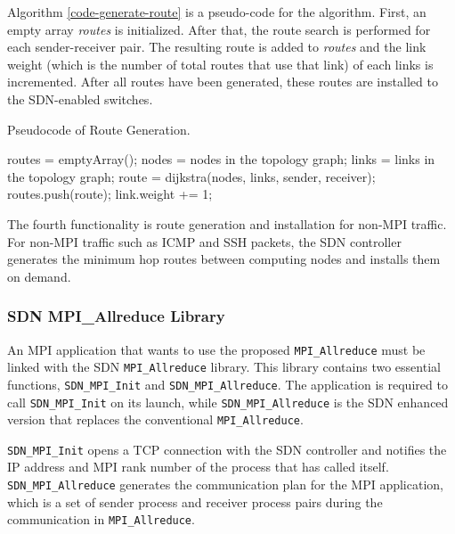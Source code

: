 Algorithm \ref{code-generate-route} is a pseudo-code for the algorithm.
First, an empty array \emph{routes} is initialized. After that, the
route search is performed for each sender-receiver pair. The resulting
route is added to \emph{routes} and the link weight (which is the number
of total routes that use that link) of each links is incremented. After
all routes have been generated, these routes are installed to the
SDN-enabled switches.

\begin{algorithm}
    \caption{Pseudocode of Route Generation.}
    \label{code-generate-route}
    \begin{algorithmic}
        \STATE routes = emptyArray();
        \STATE nodes = nodes in the topology graph;
        \STATE links = links in the topology graph;
            \STATE route = dijkstra(nodes, links, sender, receiver);
            \STATE routes.push(route);
                \STATE link.weight += 1;
            \ENDFOR
        \ENDFOR
    \end{algorithmic}
\end{algorithm}

The fourth functionality is route generation and installation for
non-MPI traffic. For non-MPI traffic such as ICMP and SSH packets, the
SDN controller generates the minimum hop routes between computing nodes
and installs them on demand.

\hypertarget{sdn-mpi_allreduce-library}{%
\subsubsection{SDN MPI\_Allreduce
Library}\label{sdn-mpi_allreduce-library}}

An MPI application that wants to use the proposed
\texttt{MPI\_Allreduce} must be linked with the SDN
\texttt{MPI\_Allreduce} library. This library contains two essential
functions, \texttt{SDN\_MPI\_Init} and \texttt{SDN\_MPI\_Allreduce}. The
application is required to call \texttt{SDN\_MPI\_Init} on its launch,
while \texttt{SDN\_MPI\_Allreduce} is the SDN enhanced version that
replaces the conventional \texttt{MPI\_Allreduce}.

\texttt{SDN\_MPI\_Init} opens a TCP connection with the SDN controller
and notifies the IP address and MPI rank number of the process that has
called itself. \texttt{SDN\_MPI\_Allreduce} generates the communication
plan for the MPI application, which is a set of sender process and
receiver process pairs during the communication in
\texttt{MPI\_Allreduce}.

